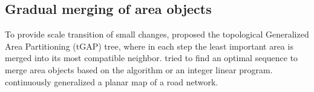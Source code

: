 \documentclass{ica}
\begin{document}


%
%

\subsection{Gradual merging of area objects}
\label{sec:gradual_merge}

To provide scale transition of small changes, 
\citet{vanOosterom2005} proposed 
the topological Generalized Area Partitioning (tGAP) tree,
where in each step the least important area is merged into
its most compatible neighbor.
\citet{Peng2020AreaAgg} tried to 
find an optimal sequence to merge area objects 
based on the \Astar algorithm or an integer linear program.
\citet{Suba2016Road} continuously generalized a planar map of a road network.
\end{document}
